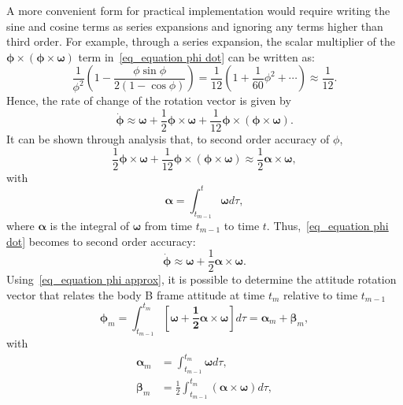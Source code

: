\documentclass[journal]{IEEEtran}
\begin{document}
A more convenient form  for practical implementation would require writing the sine and cosine terms as series expansions and ignoring any terms higher than third order. For example, through a series expansion, the scalar multiplier of the $\boldsymbol{\phi}\times(\boldsymbol{\phi}\times\boldsymbol{\omega})$ term in~\eqref{eq_equation phi dot} can be written as:
\begin{equation}
\frac{1}{\phi^2}\left(1\!-\!\frac{\phi\sin\phi}{2(1\!-\!\cos\phi)}\right)\!=\!\frac{1}{12}\left(1\!+\!\frac{1}{60}\phi^2 \!+\! \cdots \right)\!\approx\!\frac{1}{12}.
\end{equation}
Hence, the rate of change of the rotation vector is given by
\begin{equation}
     {\dot{\boldsymbol{\phi}}}\approx \boldsymbol{\omega}+\frac{1}{2}\boldsymbol{\phi}\times\boldsymbol{\omega}+\frac{1}{12}\boldsymbol{\phi}\times(\boldsymbol{\phi}\times\boldsymbol{\omega}).
\end{equation}
It can be shown through analysis that, to second order accuracy of $\phi$,
\begin{equation}
   \frac{1}{2}\boldsymbol{\phi}\times\boldsymbol{\omega}+\frac{1}{12}\boldsymbol{\phi}\times(\boldsymbol{\phi}\times\boldsymbol{\omega}) \approx  \frac{1}{2}\boldsymbol{\alpha}\times\boldsymbol{\omega},
\end{equation}
with 
\begin{equation}
\boldsymbol{\alpha} = \int_{t_{m-1}}^{t}\boldsymbol{\omega}d\tau,
\end{equation}
where $\boldsymbol{\alpha}$ is the integral of $\boldsymbol{\omega}$ from time ${t_{m-1}}$ to time $t$. 
Thus,~\eqref{eq_equation phi dot} becomes to second order accuracy:
\begin{equation}\label{eq_equation phi approx}
     {\dot{\boldsymbol{\phi}}}\approx \boldsymbol{\omega}+\frac{1}{2}\boldsymbol{\alpha}\times\boldsymbol{\omega}.
\end{equation}
Using~\eqref{eq_equation phi approx}, it is possible to determine the attitude rotation vector that relates the body B frame attitude at time $t_m$ relative to time $t_{m-1}$
\begin{equation}\label{eq_phimequation}
\boldsymbol{\phi}_m = \int_{t_{m-1}}^{t
_m}\boldsymbol{\left[\boldsymbol{\omega}+\frac{1}{2}\boldsymbol{\alpha}\times\boldsymbol{\omega}\right]}d\tau = \boldsymbol{\alpha}_m + \boldsymbol{\beta}_m,
\end{equation}
with 
\begin{align}
    \boldsymbol{\alpha}_m &= \int_{t_{m-1}}^{t_m}\boldsymbol{\omega}d\tau,
    \label{eq_alphaequation}
    \\
    \boldsymbol{\beta}_m &=\frac{1}{2} \int_{t_{m-1}}^{t_m}\left(\boldsymbol{\alpha}\times\boldsymbol{\omega}\right)d\tau,
    \label{eq_betam}
\end{align}
\end{document}
